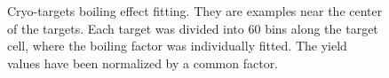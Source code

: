 \begin{figure}[!h]
\begin{center}
    \hfill
    \caption[Cryo-targets boiling effect fitting]{\footnotesize{Cryo-targets boiling effect fitting. They are examples near the center of the targets. Each target was divided into 60 bins along the target cell, where the boiling factor was individually fitted. The yield values have been normalized by a common factor.}}
    \label{cryo_boil_fit}
  \end{center}
\end{figure}
